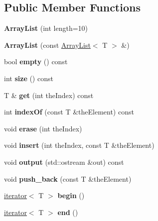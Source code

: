 \subsection*{Public Member Functions}
\begin{DoxyCompactItemize}
\item 
\mbox{\label{classArrayList_aa7ccd459591a64ad35d1616c0e69b7c5}} 
{\bfseries Array\+List} (int length=10)
\item 
\mbox{\label{classArrayList_a74e263c5124033910728983d31fc151f}} 
{\bfseries Array\+List} (const \hyperlink{classArrayList}{Array\+List}$<$ T $>$ \&)
\item 
\mbox{\label{classArrayList_a3da2b90afa063750438ddc77e178ce24}} 
bool {\bfseries empty} () const
\item 
\mbox{\label{classArrayList_ae4b736366ef526783e473ae6dd372f1c}} 
int {\bfseries size} () const
\item 
\mbox{\label{classArrayList_ac777ab7e5967cf10b2a7df72dfbb914d}} 
T \& {\bfseries get} (int the\+Index) const
\item 
\mbox{\label{classArrayList_a30daf5cbd355d72a6d957b8436233aa3}} 
int {\bfseries index\+Of} (const T \&the\+Element) const
\item 
\mbox{\label{classArrayList_a40123979eb1b36d3e35aa108be3eecd3}} 
void {\bfseries erase} (int the\+Index)
\item 
\mbox{\label{classArrayList_a58663cbe645ff5075865bca1917792be}} 
void {\bfseries insert} (int the\+Index, const T \&the\+Element)
\item 
\mbox{\label{classArrayList_ac53a6082c9b8cdbceafb0e9675a0999b}} 
void {\bfseries output} (std\+::ostream \&out) const
\item 
\mbox{\label{classArrayList_a8cdac6b82bb2435e33028a16b951d43c}} 
void {\bfseries push\+\_\+back} (const T \&the\+Element)
\item 
\mbox{\label{classArrayList_a1bfa082439cbecf0e563996e3a10811f}} 
\hyperlink{classiterator}{iterator}$<$ T $>$ {\bfseries begin} ()
\item 
\mbox{\label{classArrayList_ae0f652b027f113a5de5e8e1e6cb81d5b}} 
\hyperlink{classiterator}{iterator}$<$ T $>$ {\bfseries end} ()
\end{DoxyCompactItemize}
